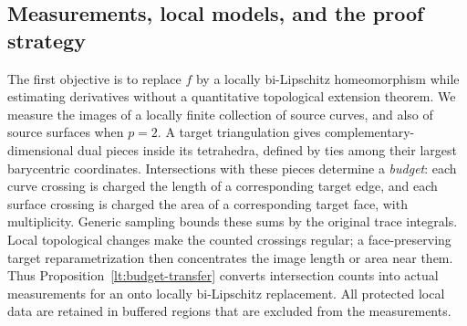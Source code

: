 \subsection{Measurements, local models, and the proof strategy}

The first objective is to replace $f$ by a locally bi-Lipschitz
homeomorphism while estimating derivatives without a quantitative
topological extension theorem. We measure the images of a locally
finite collection of source curves, and also of source surfaces when
$p=2$. A target triangulation gives complementary-dimensional dual
pieces inside its tetrahedra, defined by ties among their largest
barycentric coordinates. Intersections with these pieces determine a
\emph{budget}: each curve
crossing is charged the length of a corresponding target edge, and
each surface crossing is charged the area of a corresponding target
face, with multiplicity. Generic sampling bounds these sums by the
original trace integrals. Local topological changes make the counted
crossings regular; a face-preserving target reparametrization then
concentrates the image length or area near them. Thus
Proposition~\ref{lt:budget-transfer} converts intersection counts into
actual measurements for an onto locally bi-Lipschitz replacement.
All protected local data are retained in buffered regions that are
excluded from the measurements.

